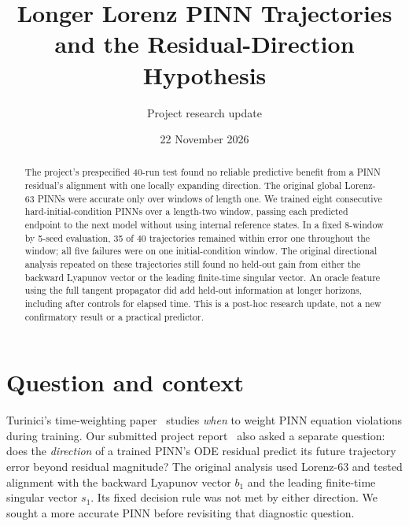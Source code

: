 \documentclass[11pt,a4paper]{article}
\title{Longer Lorenz PINN Trajectories and the Residual-Direction Hypothesis}
\author{Project research update}
\date{22 November 2026}
\begin{document}
\maketitle

\noindent{}\par\medskip

\begin{abstract}
The project's prespecified 40-run test found no reliable predictive benefit
from a PINN residual's alignment with one locally expanding direction.
The original global Lorenz-63 PINNs were accurate only over windows of length
one. We trained eight consecutive hard-initial-condition PINNs over a
length-two window, passing each predicted endpoint to the next model without
using internal reference states. In a fixed 8-window by 5-seed evaluation,
35 of 40 trajectories remained within error one throughout the window;
all five failures were on one initial-condition window. The original
directional analysis repeated on these trajectories still found no
held-out gain from either the backward Lyapunov vector or the leading
finite-time singular vector. An oracle feature using the full tangent
propagator did add held-out information at longer horizons, including after
controls for elapsed time. This is a post-hoc research update, not a new
confirmatory result or a practical predictor.
\end{abstract}

\section{Question and context}
Turinici's time-weighting paper~\cite{turinici} studies \emph{when} to weight
PINN equation violations during training. Our submitted project
report~\cite{projectreport} also asked a separate question: does the
\emph{direction} of a trained PINN's ODE residual predict its future
trajectory error beyond residual magnitude? The original analysis used
Lorenz-63 and tested alignment with the backward Lyapunov vector $b_1$ and
the leading finite-time singular vector $s_1$. Its fixed decision rule was
not met by either direction. We sought a more accurate PINN before revisiting
that diagnostic question.
\end{document}
